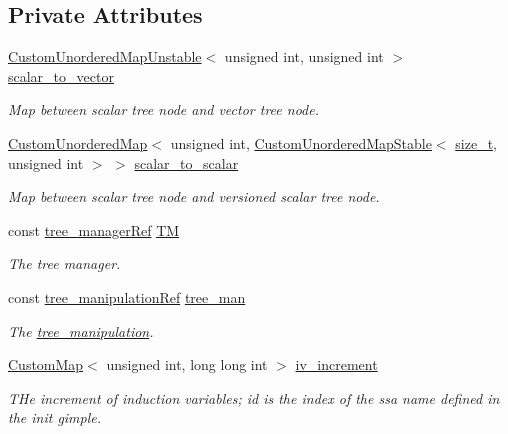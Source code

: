 \subsection*{Private Attributes}
\begin{DoxyCompactItemize}
\item 
\hyperlink{custom__map_8hpp_a8cbaceffc09790a885ec7e9c17809c69}{Custom\+Unordered\+Map\+Unstable}$<$ unsigned int, unsigned int $>$ \hyperlink{classVectorize_a16af9f9417f7b35c9f8e5f1e9921dade}{scalar\+\_\+to\+\_\+vector}
\begin{DoxyCompactList}\small\item\em Map between scalar tree node and vector tree node. \end{DoxyCompactList}\item 
\hyperlink{custom__map_8hpp_ad1ed68f2ff093683ab1a33522b144adc}{Custom\+Unordered\+Map}$<$ unsigned int, \hyperlink{custom__map_8hpp_a7314a7df1cdb3a3acf478ab86e95c226}{Custom\+Unordered\+Map\+Stable}$<$ \hyperlink{tutorial__fpt__2017_2intro_2sixth_2test_8c_a7c94ea6f8948649f8d181ae55911eeaf}{size\+\_\+t}, unsigned int $>$ $>$ \hyperlink{classVectorize_ac7ee428043e0e6f75f68a3798d01b9f5}{scalar\+\_\+to\+\_\+scalar}
\begin{DoxyCompactList}\small\item\em Map between scalar tree node and versioned scalar tree node. \end{DoxyCompactList}\item 
const \hyperlink{tree__manager_8hpp_a96ff150c071ce11a9a7a1e40590f205e}{tree\+\_\+manager\+Ref} \hyperlink{classVectorize_ad94e0c79493654ba1a0f667d4988eb35}{TM}
\begin{DoxyCompactList}\small\item\em The tree manager. \end{DoxyCompactList}\item 
const \hyperlink{tree__manipulation_8hpp_a1a9460e3a2f9fc6a96cfd2f24cc9b2a5}{tree\+\_\+manipulation\+Ref} \hyperlink{classVectorize_a2f6a50c2c425d62e05eddd680be94af7}{tree\+\_\+man}
\begin{DoxyCompactList}\small\item\em The \hyperlink{classtree__manipulation}{tree\+\_\+manipulation}. \end{DoxyCompactList}\item 
\hyperlink{custom__map_8hpp_a18ca01763abbe3e5623223bfe5aaac6b}{Custom\+Map}$<$ unsigned int, long long int $>$ \hyperlink{classVectorize_a4a4c98fd5fb2cd313641f200da09a73d}{iv\+\_\+increment}
\begin{DoxyCompactList}\small\item\em T\+He increment of induction variables; id is the index of the ssa name defined in the init gimple. \end{DoxyCompactList}\item 

\end{DoxyCompactItemize}
